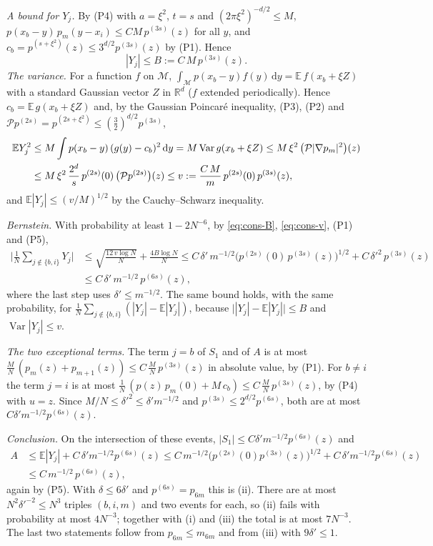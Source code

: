 \documentclass[11pt,a4paper]{article}
\makeatletter
\theoremstyle{stmt}
\theoremstyle{defn}
\theoremstyle{rmk}
\renewenvironment{proof}[1][\proofname]{\par\pushQED{\qed}\normalfont\topsep6\p@\@plus6\p@\relax
  \trivlist\item[\hskip\labelsep{\sffamily\itshape\small #1.}]\ignorespaces}{\popQED\endtrivlist\@endpefalse}
\numberwithin{equation}{section}
\newcommand{\M}{\mathcal{M}}
\newcommand{\R}{\mathbb{R}}
\newcommand{\dd}{\mathrm{d}}
\makeatother
\begin{document}
{\begin{proof}
\emph{A bound for $Y_j$.} By (P4) with $a=\xi^2$, $t=s$ and $(2\pi\xi^2)^{-d/2}\le M$, $p(x_b-y)\,p_m(y-x_i)\le CM\,p^{(3s)}(z)$ for all $y$, and $c_b=p^{(s+\xi^2)}(z)\le3^{d/2}p^{(3s)}(z)$ by (P1). Hence
\begin{equation}\label{eq:cons-B}
|Y_j|\le B:=C\,M\,p^{(3s)}(z).
\end{equation}
\emph{The variance.} For a function $f$ on $\M$, $\int_\M p(x_b-y)f(y)\,\dd y=\mathbb E\,f(x_b+\xi Z)$ with a standard Gaussian vector $Z$ in $\R^d$ ($f$ extended periodically). Hence $c_b=\mathbb E\,g(x_b+\xi Z)$ and, by the Gaussian Poincar\'e inequality, (P3), (P2) and $\mathcal Pp^{(2s)}=p^{(2s+\xi^2)}\le(\frac32)^{d/2}p^{(3s)}$,
\begin{align}
\mathbb EY_j^2&\le M\int p(x_b-y)\,(g(y)-c_b)^2\,\dd y=M\operatorname{Var}g(x_b+\xi Z)\le M\,\xi^2\,\big(\mathcal P|\nabla p_m|^2\big)(z)\notag\\
&\le M\,\xi^2\,\frac{2^d}{s}\,p^{(2s)}(0)\,\big(\mathcal Pp^{(2s)}\big)(z)\le v:=\frac{C\,M}{m}\,p^{(2s)}(0)\,p^{(3s)}(z),\label{eq:cons-v}
\end{align}
and $\mathbb E|Y_j|\le(v/M)^{1/2}$ by the Cauchy--Schwarz inequality.

\emph{Bernstein.} With probability at least $1-2N^{-6}$, by \eqref{eq:cons-B}, \eqref{eq:cons-v}, (P1) and (P5),
\[
\begin{aligned}
\Big|\frac1N\sum_{j\notin\{b,i\}}Y_j\Big|&\le\sqrt{\frac{12\,v\log N}{N}}+\frac{4B\log N}{N}\le C\,\delta'\,m^{-1/2}\big(p^{(2s)}(0)\,p^{(3s)}(z)\big)^{1/2}+C\,\delta'^2\,p^{(3s)}(z)\\
&\le C\,\delta'\,m^{-1/2}\,p^{(6s)}(z),
\end{aligned}
\]
where the last step uses $\delta'\le m^{-1/2}$. The same bound holds, with the same probability, for $\frac1N\sum_{j\notin\{b,i\}}(|Y_j|-\mathbb E|Y_j|)$, because $\big||Y_j|-\mathbb E|Y_j|\big|\le B$ and $\operatorname{Var}|Y_j|\le v$.

\emph{The two exceptional terms.} The term $j=b$ of $S_1$ and of $A$ is at most $\frac MN\,(p_m(z)+p_{m+1}(z))\le C\,\frac MN\,p^{(3s)}(z)$ in absolute value, by (P1). For $b\ne i$ the term $j=i$ is at most $\frac1N\,(p(z)\,p_m(0)+M\,c_b)\le C\,\frac MN\,p^{(3s)}(z)$, by (P4) with $u=z$. Since $M/N\le\delta'^2\le\delta'm^{-1/2}$ and $p^{(3s)}\le2^{d/2}p^{(6s)}$, both are at most $C\delta'm^{-1/2}p^{(6s)}(z)$.

\emph{Conclusion.} On the intersection of these events, $|S_1|\le C\delta'm^{-1/2}p^{(6s)}(z)$ and
\[
\begin{aligned}
A&\le\mathbb E|Y_j|+C\,\delta'm^{-1/2}p^{(6s)}(z)\le C\,m^{-1/2}\big(p^{(2s)}(0)p^{(3s)}(z)\big)^{1/2}+C\,\delta'm^{-1/2}p^{(6s)}(z)\\
&\le C\,m^{-1/2}\,p^{(6s)}(z),
\end{aligned}
\]
again by (P5). With $\delta\le6\delta'$ and $p^{(6s)}=p_{6m}$ this is (ii). There are at most $N^2\delta'^{-2}\le N^3$ triples $(b,i,m)$ and two events for each, so (ii) fails with probability at most $4N^{-3}$; together with (i) and (iii) the total is at most $7N^{-3}$. The last two statements follow from $p_{6m}\le m_{6m}$ and from (iii) with $9\delta'\le1$.
\end{proof}

}
\end{document}
